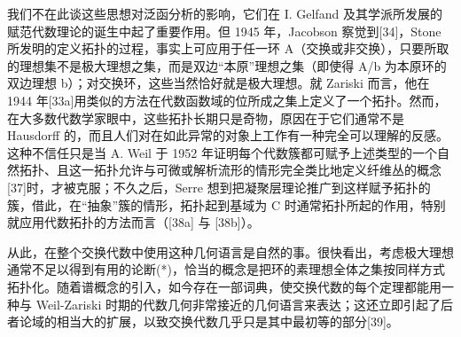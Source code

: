 我们不在此谈这些思想对泛函分析的影响，它们在 I. Gelfand 及其学派所发展的赋范代数理论的诞生中起了重要作用。但 1945 年，Jacobson 察觉到{[}34{]}，Stone 所发明的定义拓扑的过程，事实上可应用于任一环 A（交换或非交换），只要所取的理想集不是极大理想之集，而是双边“本原”理想之集（即使得 A/b 为本原环的双边理想 b）；对交换环，这些当然恰好就是极大理想。就 Zariski 而言，他在 1944 年{[}33a{]}用类似的方法在代数函数域的位所成之集上定义了一个拓扑。然而，在大多数代数学家眼中，这些拓扑长期只是奇物，原因在于它们通常不是 Hausdorff 的，而且人们对在如此异常的对象上工作有一种完全可以理解的反感。这种不信任只是当 A. Weil 于 1952 年证明每个代数簇都可赋予上述类型的一个自然拓扑、且这一拓扑允许与可微或解析流形的情形完全类比地定义纤维丛的概念{[}37{]}时，才被克服；不久之后，Serre 想到把凝聚层理论推广到这样赋予拓扑的簇，借此，在“抽象”簇的情形，拓扑起到基域为 C 时通常拓扑所起的作用，特别就应用代数拓扑的方法而言（{[}38a{]} 与 {[}38b{]}）。

从此，在整个交换代数中使用这种几何语言是自然的事。很快看出，考虑极大理想通常不足以得到有用的论断(*)，恰当的概念是把环的素理想全体之集按同样方式拓扑化。随着谱概念的引入，如今存在一部词典，使交换代数的每个定理都能用一种与 Weil-Zariski 时期的代数几何非常接近的几何语言来表达；这还立即引起了后者论域的相当大的扩展，以致交换代数几乎只是其中最初等的部分{[}39{]}。
\relax{}

